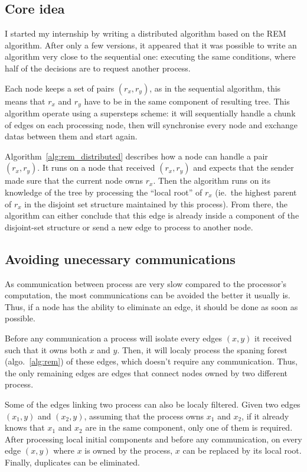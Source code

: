 \documentclass[12px]{article}
\begin{document}
    \subsection{Core idea}
      I started my internship by writing a distributed algorithm based on the REM algorithm. After only a few versions, it appeared that it was possible to write an algorithm very close to the sequential one: executing the same conditions, where half of the decisions are to request another process.

      Each node keeps a set of pairs $(r_x, r_y)$, as in the sequential algorithm, this means that $r_x$ and $r_y$ have to be in the same component of resulting tree.
      This algorithm operate using a supersteps scheme: it will sequentially handle a chunk of edges on each processing node, then will synchronise every node and exchange datas between them and start again.

      Algorithm~\ref{alg:rem_distributed} describes how a node can handle a pair $(r_x, r_y)$.
      It runs on a node that received $(r_x, r_y)$ and expects that the sender made sure that the current node owns $r_x$. Then the algorithm runs on its knowledge of the tree by processing the ``local root'' of $r_x$ (ie.\ the highest parent of $r_x$ in the disjoint set structure maintained by this process).
      From there, the algorithm can either conclude that this edge is already inside a component of the disjoint-set structure or send a new edge to process to another node.

    \subsection{Avoiding unecessary communications}
      As communication between process are very slow compared to the processor's computation, the most communications can be avoided the better it usually is. Thus, if a node has the ability to eliminate an edge, it should be done as soon as possible.

      Before any communication a process will isolate every edges $(x, y)$ it received such that it owns both $x$ and $y$. Then, it will localy process the spaning forest (algo.~\ref{alg:rem}) of these edges, which doesn't require any communication.
      Thus, the only remaining edges are edges that connect nodes owned by two different process.

      Some of the edges linking two process can also be localy filtered.
      Given two edges $(x_1, y)$ and $(x_2, y)$, assuming that the process owns $x_1$ and $x_2$, if it already knows that $x_1$ and $x_2$ are in the same component, only one of them is required.
      After processing local initial components and before any communication, on every edge $(x, y)$ where $x$ is owned by the process, $x$ can be replaced by its local root. Finally, duplicates can be eliminated.
\end{document}
